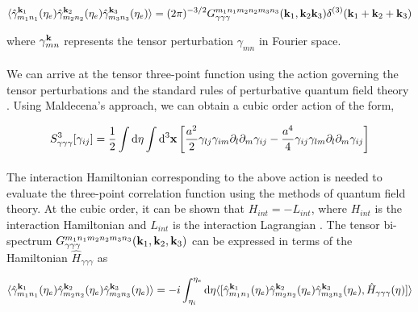 \documentclass[12pt,a4paper,oneside]{book}
\begin{document}
\begin{equation}
\langle\hat{\gamma}^{{\bf k}_1}_{m_1n_1}(\eta_e)\hat
{\gamma}^{{\bf k}_2}_{m_2n_2}(\eta_e)\hat
{\gamma}^{{\bf k}_3}_{m_3n_3}(\eta_e)\rangle = 
 (2\pi)^{-3/2}G_{\gamma\gamma\gamma}^{m_1n_1m_2n_2m_3n_3}({\bf k}_1, {\bf k}_2 {\bf k}_3)
 \delta^{(3)}({\bf k}_1+{\bf k}_2+{\bf k}_3)
\end{equation}

\noindent where ${\gamma}^{{\bf k}}_{mn}$ represents the tensor perturbation ${\gamma}_{mn}$ 
in Fourier space.

\paragraph*{} We can arrive at the tensor three-point function using the action governing the 
tensor perturbations and the standard rules of perturbative quantum field theory \cite{Maldacena, 31, 32, Pi-1, Pi-2}. 
Using Maldecena's approach, we can obtain a cubic order action of the form,

\begin{equation}
S^{3}_{\gamma\gamma\gamma}[\gamma_{ij}] = \frac{1}{2}
\int{\rm d}\eta\int{\rm d^3}{\bf x}
\left[\frac{a^2}{2}\gamma_{lj}\gamma_{im}\partial_l\partial_m\gamma_{ij}
-\frac{a^4}{4}\gamma_{ij}\gamma_{lm}\partial_l\partial_m\gamma_{ij}\right]
\end{equation}

\paragraph*{} The interaction Hamiltonian corresponding to the above action is needed 
to evaluate the three-point correlation function using the methods 
of quantum field theory. At the cubic order, it can be shown that 
$H_{int} = -L_{int}$, where $H_{int}$ is the 
interaction Hamiltonian and $L_{int}$ is the interaction Lagrangian \cite{Maldacena, 31, 32, Pi-1, Pi-2}.
The tensor bi-spectrum $G_{\gamma\gamma\gamma}^{m_1n_1m_2n_2m_3n_3}({\bf k}_1, {\bf k}_2, {\bf k}_3)$
can be expressed in terms of the Hamiltonian $\hat{H}_{\gamma\gamma\gamma}$ as \cite{32, Pi-2, 56}

\begin{equation}
\langle\hat{\gamma}^{{\bf k}_1}_{m_1n_1}(\eta_e)\hat
{\gamma}^{{\bf k}_2}_{m_2n_2}(\eta_e)\hat
{\gamma}^{{\bf k}_3}_{m_3n_3}(\eta_e)\rangle = 
-i\int_{\eta_i}^{\eta_e} {\rm d}\eta 
\langle[\hat{\gamma}^{{\bf k}_1}_{m_1n_1}(\eta_e)\hat
{\gamma}^{{\bf k}_2}_{m_2n_2}(\eta_e)\hat
{\gamma}^{{\bf k}_3}_{m_3n_3}(\eta_e),
\hat{H}_{\gamma\gamma\gamma}(\eta)]\rangle
\end{equation}
\end{document}
